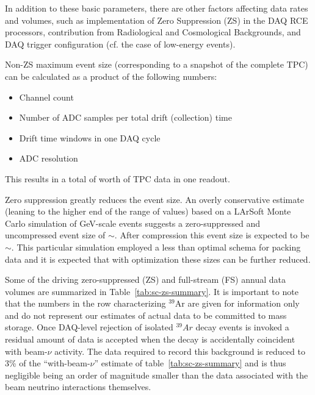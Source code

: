 In addition to these basic parameters, there are other factors
affecting data rates and volumes, such as implementation of Zero
Suppression (ZS) in the DAQ RCE processors,
contribution from Radiological and Cosmological Backgrounds, and DAQ
trigger configuration (cf. the case of low-energy events).

Non-ZS maximum event size (corresponding to a snapshot of the complete TPC) can be calculated as a product of the following numbers:
\begin{itemize}
\item Channel count
\item Number of ADC samples per total drift (collection) time
\item Drift time windows in one DAQ cycle
\item ADC resolution
\end{itemize}

This results in a total of \dunefsreadoutsize worth of TPC data in one readout.

Zero suppression greatly reduces the event size.  An overly
conservative estimate (leaning to the higher end of the range of
values) based on a LArSoft Monte Carlo simulation of GeV-scale events
suggests a zero-suppressed and uncompressed event size of
$\sim$\beameventsize.  After compression this event size is expected
to be $\sim$\beameventsizecompressed.  This particular simulation
employed a less than optimal schema for packing data and it is
expected that with optimization these sizes can be further reduced.

Some of the driving zero-suppressed (ZS) and full-stream (FS) annual
data volumes are summarized in Table~\ref{tab:sc-zs-summary}. It is
important to note that the numbers in the row characterizing $^{39}$Ar
are given for information only and do not represent our estimates of
actual data to be committed to mass storage.
Once DAQ-level rejection of isolated $^{39}Ar$ decay events is invoked
a residual amount of data is accepted when the decay is accidentally
coincident with beam-$\nu$ activity.
The data required to record this background is reduced to 3\% of the
``with-beam-$\nu$'' estimate of table~\ref{tab:sc-zs-summary} and is
thus negligible being an order of magnitude smaller than the data
associated with the beam neutrino interactions themselves.


